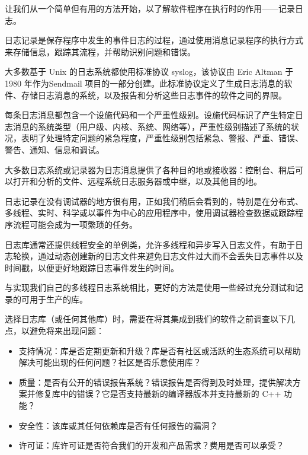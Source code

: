 
让我们从一个简单但有用的方法开始，以了解软件程序在执行时的作用——记录日志。

日志记录是保存程序中发生的事件日志的过程，通过使用消息记录程序的执行方式来存储信息，跟踪其流程，并帮助识别问题和错误。

大多数基于 Unix 的日志系统都使用标准协议 syslog，该协议由 Eric Altman 于 1980 年作为Sendmail 项目的一部分创建。此标准协议定义了生成日志消息的软件、存储日志消息的系统，以及报告和分析这些日志事件的软件之间的界限。

每条日志消息都包含一个设施代码和一个严重性级别。设施代码标识了产生特定日志消息的系统类型（用户级、内核、系统、网络等），严重性级别描述了系统的状况，表明了处理特定问题的紧急程度，严重性级别包括紧急、警报、严重、错误、警告、通知、信息和调试。

大多数日志系统或记录器为日志消息提供了各种目的地或接收器：控制台、稍后可以打开和分析的文件、远程系统日志服务器或中继，以及其他目的地。

日志记录在没有调试器的地方很有用，正如我们稍后会看到的，特别是在分布式、多线程、实时、科学或以事件为中心的应用程序中，使用调试器检查数据或跟踪程序流程可能会成为一项繁琐的任务。

日志库通常还提供线程安全的单例类，允许多线程和异步写入日志文件，有助于日志轮换，通过动态创建新的日志文件来避免日志文件过大而不会丢失日志事件以及时间戳，以便更好地跟踪日志事件发生的时间。

与实现我们自己的多线程日志系统相比，更好的方法是使用一些经过充分测试和记录的可用于生产的库。


选择日志库（或任何其他库）时，需要在将其集成到我们的软件之前调查以下几点，以避免将来出现问题：

\begin{itemize}
\item
支持情况：库是否定期更新和升级？库是否有社区或活跃的生态系统可以帮助解决可能出现的任何问题？社区是否乐意使用库？

\item
质量：是否有公开的错误报告系统？错误报告是否得到及时处理，提供解决方案并修复库中的错误？它是否支持最新的编译器版本并支持最新的 C++ 功能？

\item
安全性：该库或其任何依赖库是否有任何报告的漏洞？

\item
许可证：库许可证是否符合我们的开发和产品需求？费用是否可以承受？
\end{itemize}


